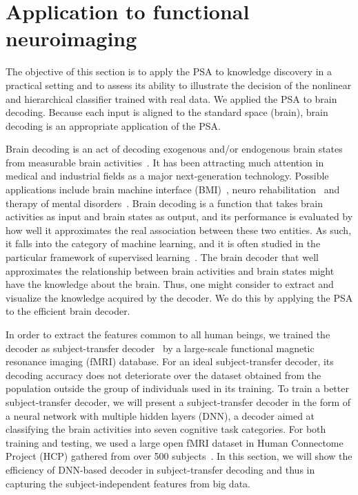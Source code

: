 \section{Application to functional neuroimaging}
\label{sec:application}

The objective of this section is to apply the PSA to knowledge discovery in
a practical setting and to assess its ability to
illustrate the decision of the nonlinear and hierarchical classifier trained with real data.
%
We applied the PSA to brain decoding.
%
Because each input is aligned to the standard space (brain),
brain decoding is an appropriate application of the PSA.

Brain decoding is an act of decoding exogenous and/or endogenous brain states from measurable brain activities~\cite{haxby2001distributed,cox2003functional,kamitani2005decoding,shibata2011perceptual,Horikawa2013}.
%
It has been attracting much attention in medical and industrial fields as a major next-generation technology.
%
Possible applications include brain machine interface
(BMI)~\cite{laconte2011decoding}, neuro
rehabilitation~\cite{sitaram2012acquired} and therapy of mental
disorders~\cite{sitaram2007fmri}.
Brain decoding is a function that takes brain activities as input and
brain states as output, and its performance is evaluated by how well it
approximates the real association between these two entities.
%
As such, it falls into the category of machine learning, and it is often
studied in the particular framework of supervised learning~\cite{lemm2011introduction}.
%
The brain decoder that well approximates the relationship between brain
activities and brain states might have the knowledge about the brain.
%
Thus, one might consider to extract and visualize the knowledge acquired by the decoder.
%
We do this by applying the PSA to the efficient brain decoder.

In order to extract the features common to all human beings,
we trained the decoder as subject-transfer decoder~\cite{fazli2009subject,raizada2012makes,marquand2014bayesian}
by a large-scale functional magnetic resonance imaging (fMRI) database.
%
For an ideal subject-transfer decoder, its decoding accuracy does not
deteriorate over the dataset obtained from the population outside the
group of individuals used in its training.
%
To train a better subject-transfer decoder, we will present a
subject-transfer decoder in the form of a neural network with multiple
hidden layers (DNN), a decoder aimed at classifying the brain activities
into seven cognitive task categories.
%
For both training and testing, we used a large open fMRI dataset in Human
Connectome Project (HCP) gathered from over 500 subjects~\cite{van2013wu}.
%
In this section, we will show the efficiency of DNN-based decoder
in subject-transfer decoding and thus in capturing
the subject-independent features from big data.

